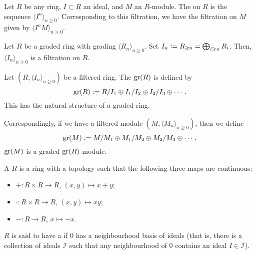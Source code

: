 \documentclass[12pt]{article}
\begin{document}
\begin{ex}
	Let $R$ be any ring, $I \subset R$ an ideal, and $M$ an $R$-module. The  on $R$ is the sequence $\langle I^{n} \rangle_{n \ge 0}$. Corresponding to this filtration, we have the filtration on $M$ given by $\langle I^{n} M \rangle_{n \ge 0}$.
\end{ex}

\begin{ex}
	Let $R$ be a graded ring with grading $\langle R_{n} \rangle_{n \ge 0}$. Set $I_{n} \vcentcolon= R_{\ge n} = \bigoplus_{i \ge n} R_{i}$. \newline
	Then, $\langle I_{n} \rangle_{n \ge 0}$ is a filtration on $R$.
\end{ex}

\begin{defn} \label{defn:associated-graded}
	Let $(R, \langle I_{n} \rangle_{n \ge 0})$ be a filtered ring. The  $\gr(R)$ is defined by
	\begin{equation*} 
		\gr(R) \vcentcolon= R/I_{1} \oplus I_{1}/I_{2} \oplus I_{2}/I_{3} \oplus \cdots.
	\end{equation*}
	This has the natural structure of a graded ring.

	Correspondingly, if we have a filtered module $(M, \langle M_{n} \rangle_{n \ge 0})$, then we define
	\begin{equation*} 
		\gr(M) \vcentcolon= M/M_{1} \oplus M_{1}/M_{2} \oplus M_{2}/M_{3} \oplus \cdots.
	\end{equation*}
	$\gr(M)$ is a graded $\gr(R)$-module.
\end{defn}

\begin{defn}
	A  $R$ is a ring with a topology such that the following three maps are continuous:
	\begin{itemize}
		\item $+ : R \times R \to R$, $(x, y) \mapsto x + y$;
		\item $\cdot : R \times R \to R$, $(x, y) \mapsto x y$;
		\item $- : R \to R$, $x \mapsto -x$.
	\end{itemize}

	$R$ is said to have a  if $0$ has a neighbourhood basis of ideals (that is, there is a collection of ideals $\mathcal{I}$ such that any neighbourhood of $0$ contains an ideal $I \in \mathcal{I}$).
\end{defn}
\end{document}
